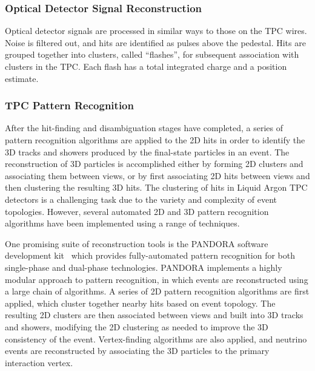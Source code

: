 \subsubsection{Optical Detector Signal Reconstruction}

Optical detector signals are processed in similar ways to those on the TPC wires.
Noise is filtered out, and hits are identified as pulses above the pedestal.
Hits are grouped together into clusters, called ``flashes'', for subsequent
association with clusters in the TPC.  Each flash has a total integrated charge and a position
estimate.


\subsubsection{TPC Pattern Recognition}

After the hit-finding and disambiguation stages have completed, a series of 
pattern recognition algorithms are applied to the 2D hits in order to identify 
the 3D tracks and showers produced by the final-state particles in an event.
The reconstruction of 3D particles is accomplished either by forming 2D clusters
and associating them between views, or by first associating 2D hits between views
and then clustering the resulting 3D hits. 
The clustering of hits in Liquid Argon TPC detectors is a challenging task
due to the variety and complexity of event topologies.
However, several automated 2D and 3D pattern recognition algorithms have been 
implemented using a range of techniques.

One promising suite of reconstruction tools is the 
PANDORA software development kit~\cite{Marshall:2013bda,Marshall:2012hh}
which provides fully-automated pattern recognition for both single-phase 
and dual-phase technologies. 
PANDORA implements a highly modular approach to pattern recognition,
in which events are reconstructed using a large chain of algorithms. 
A series of 2D pattern recognition algorithms are first applied,
which cluster together nearby hits based on event topology.
The resulting 2D clusters are then associated between views
and built into 3D tracks and showers, modifying the 2D clustering 
as needed to improve the 3D consistency of the event. 
Vertex-finding algorithms are also applied,
and neutrino events are reconstructed by associating the 
3D particles to the primary interaction vertex.

